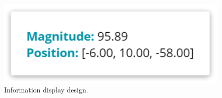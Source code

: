 \begin{figure}[H]
	\centering
	\includegraphics[scale=2]{images/design/mockups/information_display}
	\caption[Information display design]{Information display design.}
	\label{fig:information_display_design}
\end{figure}
